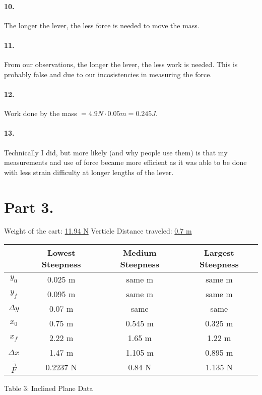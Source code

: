     \paragraph*{10.}
    The longer the lever, the less force is needed to move the mass.

    \paragraph*{11.}
    From our observations, the longer the lever, the less work is needed. This is probably false and due to our incosistencies in measuring the force.

    \paragraph*{12.}
    Work done by the mass $= 4.9 N \cdot 0.05 m = 0.245 J$.

    \paragraph*{13.}
    Technically I did, but more likely (and why people use them) is that my measurements and use of force became more efficient as it was able to be done with less strain difficulty at longer lengths of the lever.

    \pagebreak

    \section*{Part 3.}

    Weight of the cart: \underline{11.94 N}      Verticle Distance traveled: \underline{0.7 m}
    
    \begin{center}
        \begin{tabular}{|c|c|c|c|}
            \hline
                & Lowest Steepness & Medium Steepness & Largest Steepness       \\
            \hline
            $y_{0}$ & 0.025 m & same m & same m                                 \\
            \hline
            $y_{f}$ & 0.095 m & same m & same m                                 \\
            \hline
            $\Delta y$ & 0.07 m &  same &  same                                  \\
            \hline
            $x_{0}$ & 0.75 m & 0.545 m & 0.325 m                                \\
            \hline
            $x_{f}$ & 2.22 m & 1.65 m & 1.22 m                                  \\
            \hline
            $\Delta x$ & 1.47 m & 1.105 m & 0.895 m                             \\
            \hline
            $\overline{\vec{F}}$ & 0.2237 N & 0.84 N & 1.135 N                  \\
            \hline
        \end{tabular}

        Table 3: Inclined Plane Data
    \end{center}

